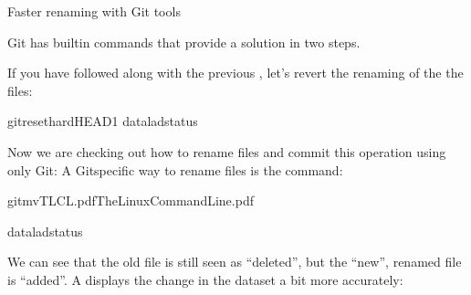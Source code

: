 \ignorespaces \begin{findoutmore}[label={fom-gitmv}, before title={\thetcbcounter\ }, check odd page=true]{Faster renaming with Git tools}
\label{\detokenize{basics/101-136-filesystem:fom-gitmv}}

\sphinxAtStartPar
Git has built\sphinxhyphen{}in commands that provide a solution in two steps.

\sphinxAtStartPar
If you have followed along with the previous , let’s revert the renaming of the the files:

\begin{sphinxVerbatim}[commandchars=\\\{\}]
gitreset\PYGZhy{}\PYGZhy{}hardHEAD\PYGZti{}1
dataladstatus
\end{sphinxVerbatim}

\sphinxAtStartPar
Now we are checking out how to rename files and commit this operation
using only Git:
A Git\sphinxhyphen{}specific way to rename files is the  command:

\begin{sphinxVerbatim}[commandchars=\\\{\}]
gitmvTLCL.pdfThe\PYGZus{}Linux\PYGZus{}Command\PYGZus{}Line.pdf
\end{sphinxVerbatim}

\begin{sphinxVerbatim}[commandchars=\\\{\}]
dataladstatus
\end{sphinxVerbatim}

\sphinxAtStartPar
We can see that the old file is still seen as “deleted”, but the “new”,
renamed file is “added”. A  displays the change
in the dataset a bit more accurately:


\end{findoutmore}

